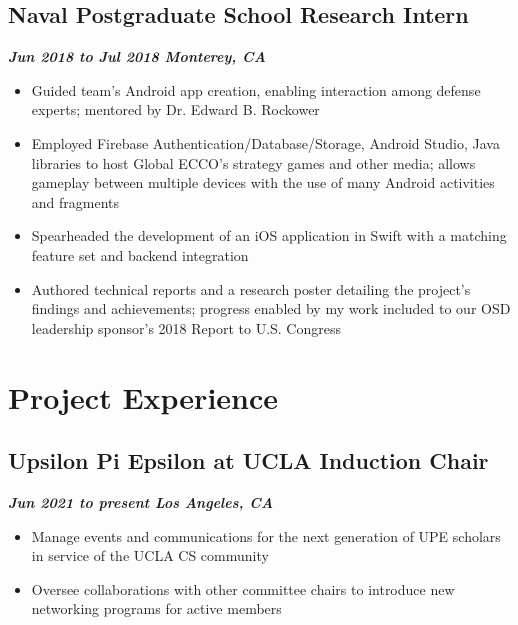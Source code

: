 \documentclass[10pt]{article}
\begin{document}
\begin{raggedright}
        \subsection*{\textbf{\large{Naval Postgraduate School \textendash{} Research Intern}}} \hfill \textbf{\textit{Jun 2018 to Jul 2018 \textendash{} Monterey, CA}}
        \begin{itemize}
            \item Guided team's Android app creation, enabling interaction among defense experts; mentored by Dr. Edward B. Rockower
            \item Employed Firebase Authentication/Database/Storage, Android Studio, Java libraries to host Global ECCO's strategy games and other media; allows gameplay between multiple devices with the use of many Android activities and fragments
            \item Spearheaded the development of an iOS application in Swift with a matching feature set and backend integration
            \item Authored technical reports and a research poster detailing the project's findings and achievements; progress enabled by my work included to our OSD leadership sponsor's 2018 Report to U.S. Congress
        \end{itemize}

    \section*{Project Experience}

        \subsection*{\textbf{\large{Upsilon Pi Epsilon at UCLA \textendash{} Induction Chair}}} \hfill \textbf{\textit{Jun 2021 to present \textendash{} Los Angeles, CA}}
        \begin{itemize}
            \item Manage events and communications for the next generation of UPE scholars in service of the UCLA CS community
            \item Oversee collaborations with other committee chairs to introduce new networking programs for active members
        \end{itemize}


\end{raggedright}
\end{document}
